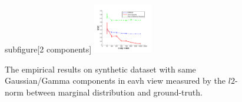 \documentclass[11pt]{article}
\begin{document}
\begin{figure}
	subfigure[2 components]{
		\includegraphics[width=0.23\textwidth]{figure/sp_sym_heter_k_2.pdf}
	}
\caption{The empirical results on synthetic dataset with same Gaussian/Gamma components in eavh view measured by the $l2$-norm between marginal distribution and ground-truth.}
\end{figure}




\end{document}
